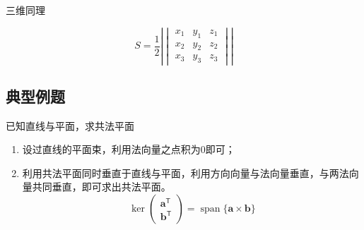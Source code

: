 \documentclass[UTF8,fontset=fandol,zihao=5]{ctexart}
\newcommand{\vect}[1]{\bm{#1}}
\begin{document}
三维同理

\[
S=\dfrac{1}{2}
\left|\begin{vmatrix}
x_1 & y_1 & z_1\\
x_2 & y_2 & z_2\\
x_3 & y_3 & z_3
\end{vmatrix}\right|
\]

\subsection{典型例题}
已知直线与平面，求共法平面

\begin{enumerate}
  \item 设过直线的平面束，利用法向量之点积为0即可；
  \item 利用共法平面同时垂直于直线与平面，利用方向向量与法向量垂直，与两法向量共同垂直，即可求出共法平面。
  \[
  \boxed{
  \ker\begin{pmatrix}
  \vect a^{\mathsf T}\\
  \vect b^{\mathsf T}
  \end{pmatrix}
  =
  \operatorname{span}\{\vect a\times\vect b\}
  }
  \] 
\end{enumerate}
\end{document}
